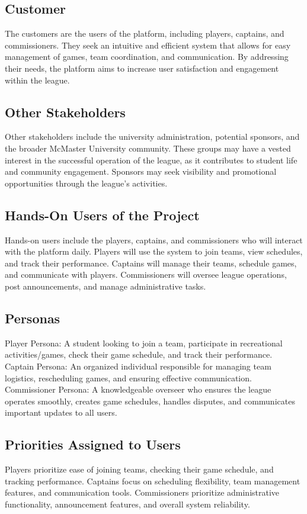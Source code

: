 \documentclass[12pt]{article}
\begin{document}
\subsection{Customer}
The customers are the users of the platform, including players, captains, and commissioners. They seek an intuitive and efficient system that allows for easy management of games, team coordination, and communication. By addressing their needs, the platform aims to increase user satisfaction and engagement within the league.
\subsection{Other Stakeholders}
Other stakeholders include the university administration, potential sponsors, and the broader McMaster University community. These groups may have a vested interest in the successful operation of the league, as it contributes to student life and community engagement. Sponsors may seek visibility and promotional opportunities through the league's activities.
\subsection{Hands-On Users of the Project}
Hands-on users include the players, captains, and commissioners who will interact with the platform daily. Players will use the system to join teams, view schedules, and track their performance. Captains will manage their teams, schedule games, and communicate with players. Commissioners will oversee league operations, post announcements, and manage administrative tasks.
\subsection{Personas}
Player Persona: A student looking to join a team, participate in recreational activities/games, check their game schedule, and track their performance.
Captain Persona: An organized individual responsible for managing team logistics, rescheduling games, and ensuring effective communication.
Commissioner Persona: A knowledgeable overseer who ensures the league operates smoothly, creates game schedules, handles disputes, and communicates important updates to all users.
\subsection{Priorities Assigned to Users}
Players prioritize ease of joining teams, checking their game schedule, and tracking performance.
Captains focus on scheduling flexibility, team management features, and communication tools.
Commissioners prioritize administrative functionality, announcement features, and overall system reliability.
\end{document}
